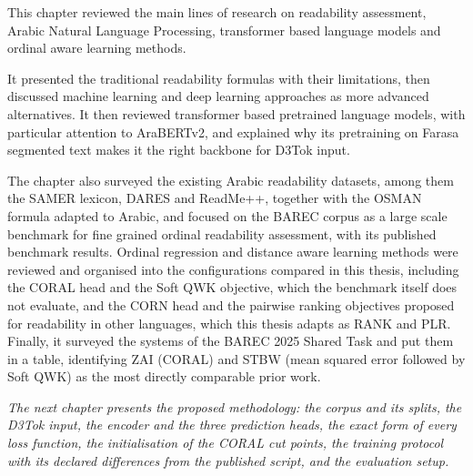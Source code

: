 This chapter reviewed the main lines of research on readability assessment, Arabic Natural Language Processing, transformer based language models and ordinal aware learning methods.

It presented the traditional readability formulas with their limitations, then discussed machine learning and deep learning approaches as more advanced alternatives. It then reviewed transformer based pretrained language models, with particular attention to AraBERTv2, and explained why its pretraining on Farasa segmented text makes it the right backbone for D3Tok input.

The chapter also surveyed the existing Arabic readability datasets, among them the SAMER lexicon, DARES and ReadMe++, together with the OSMAN formula adapted to Arabic, and focused on the BAREC corpus as a large scale benchmark for fine grained ordinal readability assessment, with its published benchmark results. Ordinal regression and distance aware learning methods were reviewed and organised into the configurations compared in this thesis, including the CORAL head and the Soft QWK objective, which the benchmark itself does not evaluate, and the CORN head and the pairwise ranking objectives proposed for readability in other languages, which this thesis adapts as RANK and PLR. Finally, it surveyed the systems of the BAREC 2025 Shared Task and put them in a table, identifying ZAI (CORAL) and STBW (mean squared error followed by Soft QWK) as the most directly comparable prior work.

\textit{The next chapter presents the proposed methodology: the corpus and its splits, the D3Tok input, the encoder and the three prediction heads, the exact form of every loss function, the initialisation of the CORAL cut points, the training protocol with its declared differences from the published script, and the evaluation setup.}
